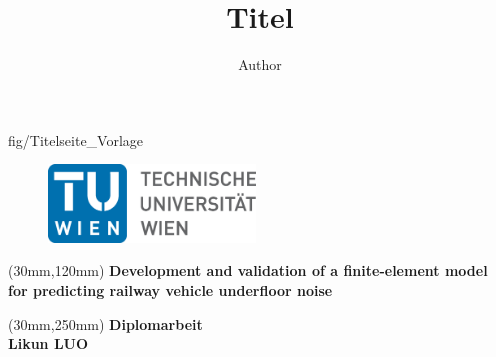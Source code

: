 \author{Author}
\title{Titel}
				
\thispagestyle{empty}							

\TileWallPaper {\paperwidth }{\paperheight } {fig/Titelseite_Vorlage}	%

\begin{flushleft}

	\begin{figure}[htbp]
		\begin{minipage}[b]{.5\linewidth}
			\begin{flushleft}
				\hspace{5mm}
				\includegraphics[width=5.5cm]{fig/TU_Logo}		
			\end{flushleft}
		\end{minipage}
	\end{figure}


 \begin{spacing}{2.5}
     	\begin{textblock*}{14cm}(30mm,120mm)
        \textbf{\Huge Development and validation of a finite-element model for predicting railway vehicle underfloor noise}
	\end{textblock*}
 \end{spacing}

	
	\begin{textblock*}{14cm}(30mm,250mm)
		\textbf{\large Diplomarbeit} \\[3mm]
		\textbf{\huge Likun LUO}
	\end{textblock*}

\end{flushleft}

